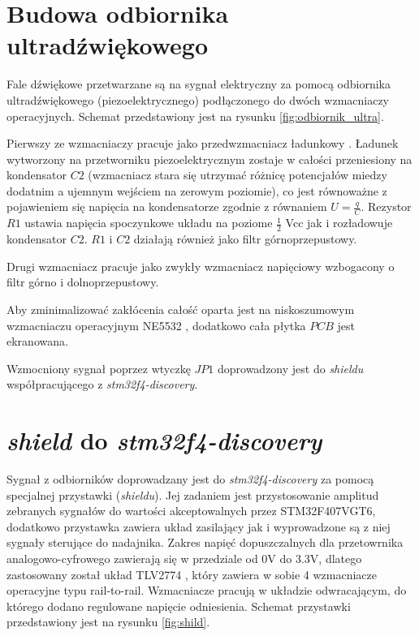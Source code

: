 


\clearpage
\section{Budowa odbiornika ultradźwiękowego}

Fale dźwiękowe przetwarzane są na sygnał elektryczny za pomocą odbiornika ultradźwiękowego (piezoelektrycznego) 
podłączonego do dwóch wzmacniaczy operacyjnych. Schemat przedstawiony jest na rysunku \ref{fig:odbiornik_ultra}.


Pierwszy ze wzmacniaczy pracuje jako przedwzmacniacz ładunkowy \cite{bib:wzm_ladunkowy}.
Ładunek wytworzony na przetworniku piezoelektrycznym zostaje w całości przeniesiony na kondensator $C2$ 
(wzmacniacz stara się utrzymać różnicę potencjałów miedzy dodatnim a ujemnym wejściem na zerowym poziomie),
co jest równoważne z pojawieniem się napięcia na kondensatorze zgodnie z równaniem $U=\frac{q}{C}$.
Rezystor $R1$ ustawia napięcia spoczynkowe układu na poziome $\frac{1}{2}$ Vcc jak i rozładowuje kondensator $C2$.
$R1$ i $C2$ działają również jako filtr górnoprzepustowy.

Drugi wzmacniacz pracuje jako zwykły wzmacniacz napięciowy wzbogacony o filtr górno i dolnoprzepustowy.

Aby zminimalizować zakłócenia całość oparta jest na niskoszumowym wzmacniaczu operacyjnym NE5532 \cite{bib:ne5532}, 
dodatkowo cała płytka $PCB$ jest ekranowana.

Wzmocniony sygnał poprzez wtyczkę $JP1$ doprowadzony jest do \textit{shieldu} współpracującego z \textit{stm32f4-discovery}.

\clearpage

\section{\textit{shield} do \textit{stm32f4-discovery}}

Sygnał z odbiorników doprowadzany jest do \textit{stm32f4-discovery} za pomocą specjalnej przystawki (\textit{shieldu}).
Jej zadaniem jest przystosowanie amplitud zebranych sygnałów do wartości akceptowalnych przez STM32F407VGT6,
dodatkowo przystawka zawiera układ zasilający jak i wyprowadzone są z niej sygnały sterujące do nadajnika.
Zakres napięć dopuszczalnych dla przetowrnika analogowo-cyfrowego zawierają się w przedziale od 0V do 3.3V,
dlatego zastosowany został układ TLV2774 \cite{bib:TLV2774}, który zawiera w sobie 4 wzmacniacze operacyjne typu
rail-to-rail. Wzmacniacze pracują w układzie odwracającym, do którego dodano regulowane napięcie odniesienia.
Schemat przystawki przedstawiony jest na rysunku \ref{fig:shild}.






